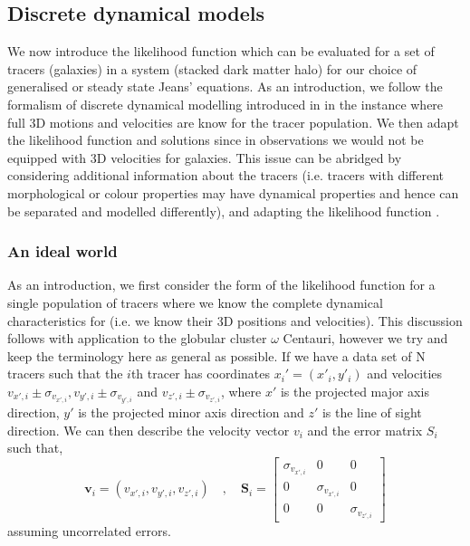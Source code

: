 \subsection{Discrete dynamical models} \label{sec:discrete_dynamical_models}
We now introduce the likelihood function which can be evaluated for a set of tracers (galaxies) in a system (stacked dark matter halo) for our choice of generalised or steady state Jeans' equations. As an introduction, we follow the formalism of discrete dynamical modelling introduced in \citet{watkins2013} in the instance where full 3D motions and velocities are know for the tracer population. We then adapt the likelihood function and solutions since in observations we would not be equipped with 3D velocities for galaxies. This issue can be abridged by considering additional information about the tracers (i.e. tracers with different morphological or colour properties may have dynamical properties and hence can be separated and modelled differently), and adapting the likelihood function \citep[e.g.][]{zhu16sculptor}.

\subsubsection{An ideal world}
As an introduction, we first consider the form of the likelihood function for a single population of tracers where we know the complete dynamical characteristics for (i.e. we know their 3D positions and velocities). This discussion follows \citet{watkins2013} with application to the globular cluster $\omega$ Centauri, however we try and keep the terminology here as general as possible. If we have a data set of N tracers such that the $i$th tracer has coordinates $x_{i}'= (x'_{i},y'_{i})$ and velocities $v_{x',i} \pm \sigma_{v_{x',i}}, v_{y',i} \pm \sigma_{v_{y',i}}$ and $v_{z',i} \pm \sigma_{v_{z',i}}$, where $x'$ is the projected major axis direction, $y'$ is the projected minor axis direction and $z'$ is the line of sight direction. We can then describe the velocity vector \textbf{$v_{i}$} and the error matrix \textbf{$S_{i}$} such that,
\begin{equation}
\boldsymbol{v}_{i} = (v_{x',i},v_{y',i},v_{z',i}) \quad , \quad \boldsymbol{S}_{i} = \begin{bmatrix} \sigma_{v_{x',i}} & 0 & 0 \\ 0 & \sigma_{v_{x',i}} & 0 \\ 0 & 0 & \sigma_{v_{z',i}} \end{bmatrix}
\end{equation}
assuming uncorrelated errors.

